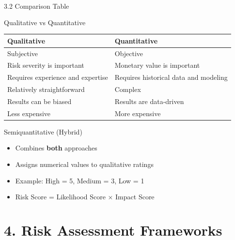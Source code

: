 \documentclass[9pt]{beamer}  %
\begin{document}
	\begin{frame}{3.2 Comparison Table}
		\begin{block}{Qualitative vs Quantitative}
			\begin{tabular}{|p{4.5cm}|p{5.5cm}|}
				\hline
				\textbf{Qualitative} & \textbf{Quantitative} \\
				\hline
				Subjective & Objective \\
				\hline
				Risk severity is important & Monetary value is important \\
				\hline
				Requires experience and expertise & Requires historical data and modeling \\
				\hline
				Relatively straightforward & Complex \\
				\hline
				Results can be biased & Results are data-driven \\
				\hline
				Less expensive & More expensive \\
				\hline
			\end{tabular}
		\end{block}
		
		\begin{exampleblock}{Semiquantitative (Hybrid)}
			\begin{itemize}
				\item Combines \textbf{both} approaches
				\item Assigns numerical values to qualitative ratings
				\item Example: High = 5, Medium = 3, Low = 1
				\item Risk Score = Likelihood Score × Impact Score
			\end{itemize}
		\end{exampleblock}
	\end{frame}
	
	\section{4. Risk Assessment Frameworks}
	
\end{document}
